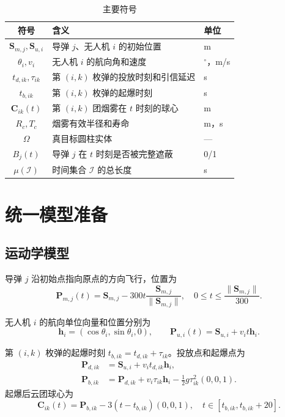 \documentclass[12pt,a4paper]{article}
\begin{document}
\begin{table}[H]
\centering
\caption{主要符号}
\label{tab:symbols}
\begin{tabular}{cll}
\toprule
符号 & 含义 & 单位 \\
\midrule
$\boldsymbol S_{m,j},\boldsymbol S_{u,i}$ & 导弹 $j$、无人机 $i$ 的初始位置 & m \\
$\theta_i,v_i$ & 无人机 $i$ 的航向角和速度 & $^\circ$，m/s \\
$t_{d,ik},\tau_{ik}$ & 第 $(i,k)$ 枚弹的投放时刻和引信延迟 & s \\
$t_{b,ik}$ & 第 $(i,k)$ 枚弹的起爆时刻 & s \\
$\boldsymbol C_{ik}(t)$ & 第 $(i,k)$ 团烟雾在 $t$ 时刻的球心 & m \\
$R_c,T_c$ & 烟雾有效半径和寿命 & m，s \\
$\Omega$ & 真目标圆柱实体 & --- \\
$B_j(t)$ & 导弹 $j$ 在 $t$ 时刻是否被完整遮蔽 & 0/1 \\
$\mu(\mathcal I)$ & 时间集合 $\mathcal I$ 的总长度 & s \\
\bottomrule
\end{tabular}
\end{table}

\section{统一模型准备}

\subsection{运动学模型}

导弹 $j$ 沿初始点指向原点的方向飞行，位置为
\begin{equation}
\boldsymbol P_{m,j}(t)=\boldsymbol S_{m,j}-300t\frac{\boldsymbol S_{m,j}}{\|\boldsymbol S_{m,j}\|},
\quad 0\le t\le \frac{\|\boldsymbol S_{m,j}\|}{300}.
\label{eq:missile}
\end{equation}

无人机 $i$ 的航向单位向量和位置分别为
\begin{equation}
\boldsymbol h_i=(\cos\theta_i,\sin\theta_i,0),\qquad
\boldsymbol P_{u,i}(t)=\boldsymbol S_{u,i}+v_it\boldsymbol h_i.
\label{eq:uav}
\end{equation}

第 $(i,k)$ 枚弹的起爆时刻 $t_{b,ik}=t_{d,ik}+\tau_{ik}$。投放点和起爆点为
\begin{align}
\boldsymbol P_{d,ik}&=\boldsymbol S_{u,i}+v_it_{d,ik}\boldsymbol h_i,\\
\boldsymbol P_{b,ik}&=\boldsymbol P_{d,ik}+v_i\tau_{ik}\boldsymbol h_i-\frac12g\tau_{ik}^2(0,0,1).
\label{eq:bomb}
\end{align}
起爆后云团球心为
\begin{equation}
\boldsymbol C_{ik}(t)=\boldsymbol P_{b,ik}-3(t-t_{b,ik})(0,0,1),
\quad t\in[t_{b,ik},t_{b,ik}+20].
\label{eq:cloud}
\end{equation}
\end{document}

